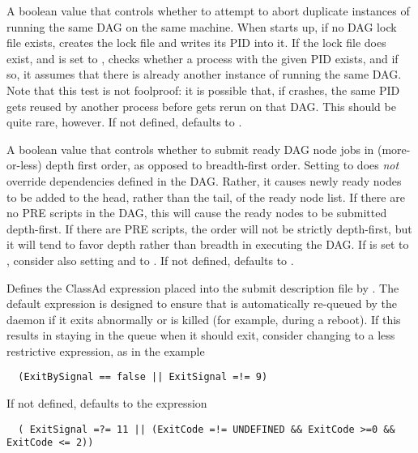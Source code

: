 \begin{description}
\label{param:DAGManAbortDuplicates}
\item[\Macro{DAGMAN\_ABORT\_DUPLICATES}]
  A boolean value that controls whether to attempt to abort duplicate
  instances of  running the same DAG on the same
  machine.  When  starts up, if no DAG lock file exists,
   creates the lock file and writes its PID into it.  If
  the lock file does exist, and  is
  set to ,  checks whether a process with the
  given PID exists, and if so, it assumes that there is already another
  instance of  running the same DAG.  Note that this
  test is not foolproof: it is possible that, if  crashes,
  the same PID gets reused by another process before 
  gets rerun on that DAG.  This should be quite rare, however.
  If not defined,  defaults to
  .

\label{param:DAGManSubmitDepthFirst}
\item[\Macro{DAGMAN\_SUBMIT\_DEPTH\_FIRST}]
  A boolean value that controls whether to submit ready DAG node jobs
  in (more-or-less) depth first order, as opposed to breadth-first order.
  Setting  to  does
  \emph{not} override dependencies defined in the DAG.  Rather, it
  causes newly ready nodes to be added to the head, rather than the tail,
  of the ready node list.  If there are no PRE scripts in the DAG, this
  will cause the ready nodes to be submitted depth-first.  If there
  are PRE scripts, the order will not be strictly depth-first, but it
  will tend to favor depth rather than breadth in executing the DAG.
  If  is set to ,
  consider also setting  and
   to .
  If not defined,  defaults to
  .

\label{param:DAGManOnExitRemove}
\item[\Macro{DAGMAN\_ON\_EXIT\_REMOVE}]
  Defines the  ClassAd expression placed
  into the  submit description file by .
  The default expression is designed to ensure that  is
  automatically re-queued by the  daemon if it exits abnormally
  or is killed (for example, during a reboot).
  If this results in 
  staying in the queue when it should exit, consider changing 
  to a less restrictive expression, as in the example
\footnotesize
\begin{verbatim}
  (ExitBySignal == false || ExitSignal =!= 9)
\end{verbatim}
\normalsize
  If not defined,  defaults to
  the expression
\footnotesize
\begin{verbatim}
  ( ExitSignal =?= 11 || (ExitCode =!= UNDEFINED && ExitCode >=0 && ExitCode <= 2))
\end{verbatim}
\normalsize


\end{description}
